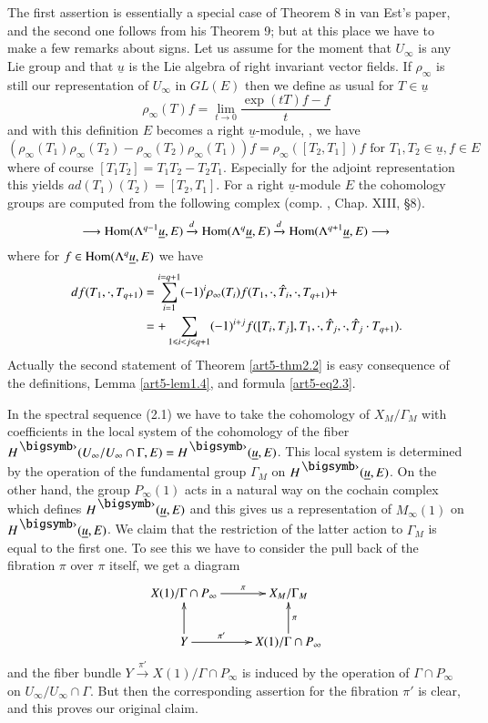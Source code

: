The first assertion is essentially a special case of Theorem 8 in van Est's paper, and the second one follows from his Theorem 9; but at this place  we have to make a few remarks about signs. Let us assume for the moment that $U_\infty$ is any Lie group and that $\underline{u}$ is the Lie algebra of right invariant vector fields. If $\rho_\infty$ is still our representation of $U_\infty$ in $GL(E)$ then we define as usual for $T \in \underline{u}$
$$
\rho_\infty (T) f = \lim\limits_{t \to 0} \frac{\exp (t T)f -f}{t}
$$
and with this definition $E$ becomes a right $\underline{u}$-module, \ie, we have
$$
(\rho_\infty (T_1) \rho_\infty (T_2) - \rho_\infty (T_2) \rho_\infty (T_1) ) f = \rho_\infty ([T_2, T_1]) f \text{ for } T_1, T_2 \in \underline{u}, f \in E
$$
where of course $[T_1 T_2] = T_1 T_2 - T_2 T_1$. Especially for the adjoint representation this yields $ad (T_1) (T_2) = [T_2, T_1]$. For a right $\underline{u}$-module $E$ the cohomology groups are computed from the following complex (comp. \cite{art5-key3}, Chap. XIII, \S 8).
$$
\longrightarrow \operatorname{Hom} (\Lambda^{q-1} \underline{u}, E) \xrightarrow{d} \operatorname{Hom} (\Lambda^q \underline{u}, E)\xrightarrow{d} \operatorname{Hom} (\Lambda^{q+1} \underline{u}, E) \longrightarrow
$$
where for $f \in \operatorname{Hom} (\Lambda^q \underline{u}, E)$  we have
\begin{align}
df (T_1 , \cdot , T_{q+1}) & = \sum\limits^{i=q+1}_{i=1} (-1)^i \rho_\infty (T_i)  f (T_1 , \cdot, \hat{T}_i, \cdot , T_{q+1}) + \notag\\
& = + \sum\limits_{1 \leqslant i < j \leqslant q +1} (-1)^{i+ j} f ([T_i, T_j], T_1 , \cdot , \hat{T}_j, \cdot , \hat{T}_j \cdot T_{q+1}). \label{art5-eq2.3}
\end{align}
Actually the second statement of Theorem \ref{art5-thm2.2} is easy consequence of the definitions, Lemma \ref{art5-lem1.4}, and formula \ref{art5-eq2.3}.

In the spectral sequence (2.1) we have to take the cohomology of $X_M/ \Gamma_M$ with coefficients in the local system of the cohomology of  the fiber\pageoriginale $H^\bigdot (U_\infty / U_\infty \cap \Gamma, E) = H^\bigdot (\underline{u}, E)$. This local system is determined by the operation of the fundamental group $\Gamma_M$ on $H^\bigdot (\underline{u}, E)$. On the other hand, the group $P_\infty (1)$ acts in a natural way on the cochain complex which defines $H^\bigdot (\underline{u}, E)$ and this gives us a representation of $M_\infty (1)$ on $H^\bigdot (\underline{u}, E)$. We claim that the restriction of the latter action to $\Gamma_M$ is equal to the first one. To see this we have to consider the pull back of the fibration $\pi$ over $\pi$ itself, we get a diagram 
$$
\xymatrix{
X(1)/ \Gamma \cap P_\infty \ar[r]^-\pi & X_M / \Gamma_M \\
Y\ar[r]^-{\pi'} \ar[u] & X(1) / \Gamma \cap P_\infty \ar[u]_-\pi
}
$$
and the fiber bundle $Y \xrightarrow{\pi'} X (1) / \Gamma \cap P_\infty$ is induced by the operation of $\Gamma \cap P_\infty$ on $U_\infty/ U_\infty \cap \Gamma$. But then the corresponding assertion for the fibration $\pi'$ is clear, and this proves our original claim. 

